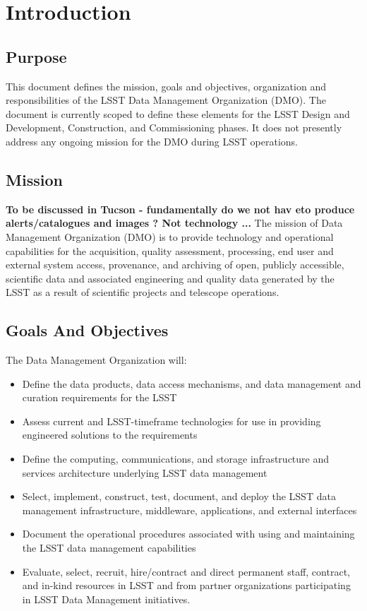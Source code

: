 \section{Introduction}
\subsection{Purpose}
This document defines the mission, goals and objectives, organization and responsibilities of the LSST Data Management Organization (DMO).  The document is currently scoped to define these elements for the LSST Design and Development, Construction, and Commissioning phases.  It does not presently address any ongoing mission for the DMO during LSST operations.

\subsection{Mission}
{\bf To be discussed in Tucson  - fundamentally do we not hav eto produce alerts/catalogues and images ? Not technology ...}
The mission of Data Management Organization (DMO) is to provide technology and operational capabilities for the acquisition, quality assessment, processing, end user and external system access, provenance, and archiving of open, publicly accessible, scientific data and associated engineering and quality data generated by the LSST as a result of scientific projects and telescope operations.

\subsection{Goals And Objectives}
The Data Management Organization will:
\begin{itemize}
\item Define the data products, data access mechanisms, and data management and curation requirements for the LSST
\item Assess current and LSST-timeframe technologies for use in providing engineered solutions to the requirements
\item Define the computing, communications, and storage infrastructure and services architecture underlying LSST data management
\item Select, implement, construct, test, document, and deploy the LSST data management infrastructure, middleware, applications, and external interfaces
\item Document the operational procedures associated with using and maintaining the LSST data management capabilities
\item Evaluate, select, recruit, hire/contract and direct permanent staff, contract, and in-kind resources in LSST and from partner organizations participating in LSST Data Management initiatives.

\end{itemize}
	


